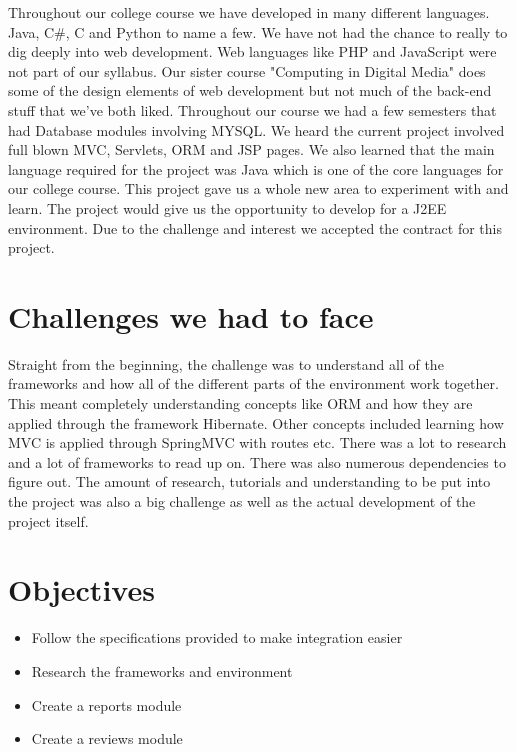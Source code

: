 Throughout our college course we have developed in many different languages. Java, C\#, C and Python to name a few. We have not had the chance to really to dig deeply into web development. Web languages like PHP and JavaScript were not part of our syllabus. Our sister course "Computing in Digital Media" does some of the design elements of web development but not much of the back-end stuff that we've both liked. Throughout our course we had a few semesters that had Database modules involving MYSQL. We heard the current project involved full blown MVC, Servlets, ORM and JSP pages. We also learned that the main language required for the project was Java which is one of the core languages for our college course. This project gave us a whole new area to experiment with and learn. The project would give us the opportunity to develop for a J2EE environment. Due to the challenge and interest we accepted the contract for this project.

\section{Challenges we had to face}    

Straight from the beginning, the challenge was to understand all of the frameworks and how all of the different parts of the environment work together. This meant completely understanding concepts like ORM and how they are applied through the framework Hibernate. Other concepts included learning how MVC is applied through SpringMVC with routes etc. There was a lot to research and a lot of frameworks to read up on. There was also numerous dependencies to figure out. The amount of research, tutorials and understanding to be put into the project was also a big challenge as well as the actual development of the project itself. 


\section{Objectives}

\begin{itemize}
\item{Follow the specifications provided to make integration easier}
\item{Research the frameworks and environment}
\item{Create a reports module}
\item{Create a reviews module}
\end{itemize}

